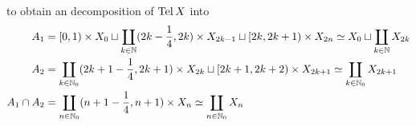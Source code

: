 \begin{sketch}
\begin{center}
		\end{center}
		to obtain an decomposition of $\operatorname{Tel} X$ into
		\begin{align*}
			A_1 &= [0,1) \times X_0 \sqcup \coprod \limits_{k \in \mathbb{N}} (2k-\frac{1}{4},2k) \times X_{2k-1} \sqcup [2k,2k+1) \times X_{2n} \simeq X_0 \sqcup \coprod \limits_{k \in \mathbb{N}} X_{2k}\\
			A_2 &= \coprod \limits_{k \in \mathbb{N}_0} (2k+1-\frac{1}{4},2k+1) \times X_{2k} \sqcup [2k+1,2k+2) \times X_{2k+1} \simeq \coprod \limits_{k \in \mathbb{N}_0} X_{2k+1}\\
			A_1 \cap A_2 &= \coprod \limits_{n \in \mathbb{N}_0} (n+1-\frac{1}{4},n+1)\times X_n \simeq \coprod \limits_{n \in \mathbb{N}_0} X_n 
 		\end{align*}
	\end{sketch}








